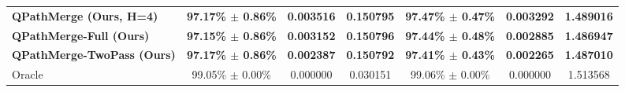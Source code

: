 \begin{table}[t]
\begin{center}
\begin{small}
\begin{sc}
\begin{tabular}{lcccccc}
\textbf{QPathMerge (Ours, H=4)} & \textbf{97.17\% $\pm$ 0.86\%} & \textbf{0.003516} & \textbf{0.150795} & \textbf{97.47\% $\pm$ 0.47\%} & \textbf{0.003292} & \textbf{1.489016} \\
\textbf{QPathMerge-Full (Ours)} & \textbf{97.15\% $\pm$ 0.86\%} & \textbf{0.003152} & \textbf{0.150796} & \textbf{97.44\% $\pm$ 0.48\%} & \textbf{0.002885} & \textbf{1.486947} \\
\textbf{QPathMerge-TwoPass (Ours)} & \textbf{97.17\% $\pm$ 0.86\%} & \textbf{0.002387} & \textbf{0.150792} & \textbf{97.41\% $\pm$ 0.43\%} & \textbf{0.002265} & \textbf{1.487010} \\
\midrule
Oracle            & 99.05\% $\pm$ 0.00\% & 0.000000 & 0.030151 & 99.06\% $\pm$ 0.00\% & 0.000000 & 1.513568 \\
\bottomrule
\end{tabular}
\end{sc}
\end{small}
\end{center}
\vskip -0.1in
\end{table}

